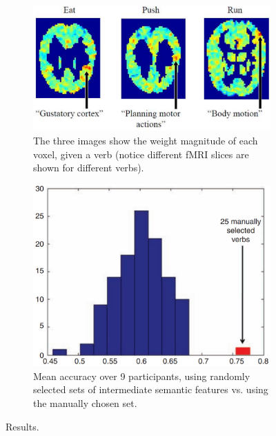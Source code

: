 \begin{figure}[!ht]
    \centering
    \captionsetup{width=.8\linewidth}
    \begin{subfigure}{.52\textwidth}
        \centering
        \captionsetup{width=.8\linewidth}
        \includegraphics[width=.9\linewidth]{images/mitchell_4.png}
        \caption{The three images show the weight magnitude of each voxel, given a verb (notice different fMRI slices are shown for different verbs).}
        \label{fig:mitchell_4}
    \end{subfigure}%
    \begin{subfigure}{.47\textwidth}
        \centering
        \captionsetup{width=.8\linewidth}
        \includegraphics[width=.8\linewidth]{images/mitchell_5.png}
        \caption{Mean accuracy over 9 participants, using  randomly selected sets of intermediate semantic features vs. using the manually chosen set.}
        \label{fig:mitchell_5}
    \end{subfigure}
    \caption{Results.}
    \label{fig:mitchell_45}
\end{figure}


